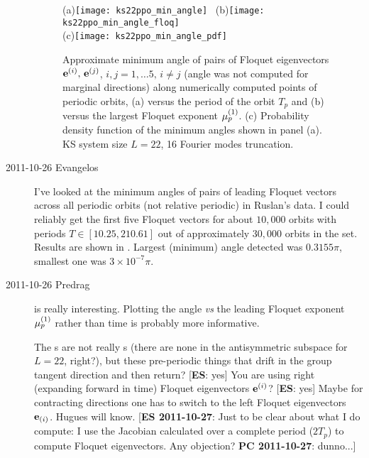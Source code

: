 \begin{description}
\begin{figure}
 (a)\texttt{[image: ks22ppo\_min\_angle]}
 ~(b)\texttt{[image: ks22ppo\_min\_angle\_floq]}\\
 (c)\texttt{[image: ks22ppo\_min\_angle\_pdf]}
\caption{
Approximate minimum angle of pairs of Floquet eigenvectors
$\jEigvec[i],\, \jEigvec[j]$, $i,j=1,\ldots 5,\, i\neq j$ (angle was not
computed for marginal directions) along numerically computed points of
periodic orbits, (a) versus the period of the orbit $T_p$ and (b)
versus the largest Floquet exponent $\eigRe[1]_p$.
(c) Probability density function of the minimum angles shown in panel
(a). KS system size $L=22$, 16 Fourier modes truncation.
}
\label{fig:ks22ppo_min_angle}
\end{figure}


\item[2011-10-26 Evangelos]
I've looked at the minimum angles of pairs of leading Floquet vectors
across all periodic orbits (not relative periodic) in Ruslan's data. I
could reliably get the first five Floquet vectors for about $10,000$
orbits with periods $T\in[10.25, 210.61]$ out of approximately $30,000$
orbits in the set. Results are shown in .
Largest (minimum) angle detected was $0.3155\pi$, smallest one was
$3\times10^{-7}\pi$.

\item[2011-10-26 Predrag]  is really
interesting. Plotting the angle {\em vs} the leading Floquet exponent $\eigRe[1]_p$
rather than time  is probably more informative.


The \po s are not really \po s (there are none in the
antisymmetric subspace for $L=22$, right?), but these pre-periodic
things that drift in the group tangent direction and then return? [{\bf ES}: yes]
You are using right (expanding forward in time) Floquet eigenvectors
$\jEigvec[i]$? [{\bf ES}: yes] Maybe for contracting directions one has to switch to the
left Floquet eigenvectors $\jEigvecT[i]$. Hugues will know.
[{\bf ES 2011-10-27}: Just to be clear about what I do compute: I use the Jacobian
calculated over a complete period ($2T_p$) to compute Floquet eigenvectors.
Any objection? {\bf PC 2011-10-27}: dunno...]



\end{description}
